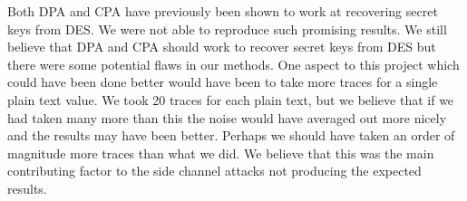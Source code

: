 	Both DPA and CPA have previously been shown to work at recovering secret keys from DES.  We were not able to reproduce such promising results.  We still believe that DPA and CPA should work to recover secret keys from DES but there were some potential flaws in our methods.
  One aspect to this project which could have been done better would have been to take more traces for a single plain text value.  We took 20 traces for each plain text, but we believe that if we had taken many more than this the noise would have averaged out more nicely and the results may have been better.  Perhaps we should have taken an order of magnitude more traces than what we did.  We believe that this was the main contributing factor to the side channel attacks not producing the expected results.











